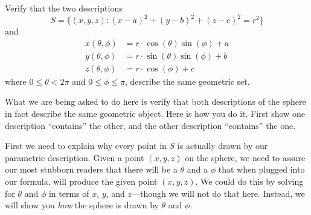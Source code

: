 \documentclass{ximera}
\begin{document}
\begin{example}
  Verify that the two descriptions
  \[
  S = \{(x,y,z):(x-a)^2+(y-b)^2+(z-c)^2=r^2\}
  \]
  and
  \begin{align*}
    x(\theta,\phi) &=r\cdot\cos(\theta)\sin(\phi)+a\\
    y(\theta,\phi) &=r\cdot\sin(\theta)\sin(\phi)+b\\
    z(\theta,\phi) &=r\cdot\cos(\phi)+c
  \end{align*}
  where $0\le \theta<2\pi$ and $0\le \phi\le \pi$, describe the same
  geometric set.
  \begin{explanation}
    What we are being asked to do here is verify that both
    descriptions of the sphere in fact describe the same geometric
    object.  Here is how you do it. First show one description
    ``contains'' the other, and the other description ``contains'' the
    one.


First we need to explain why every point in $S$ is actually drawn by
    our parametric description. Given a point $(x,y,z)$ on the sphere,
    we need to assure our most stubborn readers that there will be a
    $\theta$ and a $\phi$ that when plugged into our formula, will
    produce the given point $(x,y,z)$. We could do this by solving for
    $\theta$ and $\phi$ in terms of $x$, $y$, and $z$---though we will
    not do that here. Instead, we will show you \textit{how} the
    sphere is drawn by $\theta$ and $\phi$.
      \begin{image}
\end{image}
\end{explanation}
\end{example}
\end{document}

